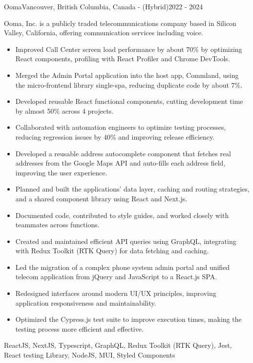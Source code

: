 \begin{projects}
    \project
    {Ooma}{Vancouver, British Columbia, Canada - (Hybrid)}{2022 - 2024}
    {}
    {Ooma, Inc. is a publicly traded telecommunications company based in Silicon Valley, California, offering communication services including voice.
    \begin{itemize}
        \item Improved Call Center screen load performance by about 70\% by optimizing React components, profiling with React Profiler and Chrome DevTools.
        \item Merged the Admin Portal application into the host app, Commland, using the micro-frontend library single-spa, reducing duplicate code by about 7\%.
        \item Developed reusable React functional components, cutting development time by almost 50\% across 4 projects.
        \item Collaborated with automation engineers to optimize testing processes, reducing regression issues by 40\% and improving release efficiency.
        \item Developed a reusable address autocomplete component that fetches real addresses from the Google Maps API and auto-fills each address field, improving the user experience.
        \item Planned and built the applications' data layer, caching and routing strategies, and a shared component library using React and Next.js.
        \item Documented code, contributed to style guides, and worked closely with teammates across functions.
        \item Created and maintained efficient API queries using GraphQL, integrating with Redux Toolkit (RTK Query) for data fetching and caching.
        \item Led the migration of a complex phone system admin portal and unified telecom application from jQuery and JavaScript to a React.js SPA.
        \item Redesigned interfaces around modern UI/UX principles, improving application responsiveness and maintainability.
        \item Optimized the Cypress.js test suite to improve execution times, making the testing process more efficient and effective.
    \end{itemize}}
    {ReactJS, NextJS, Typescript, GraphQL, Redux Toolkit (RTK Query), Jest, React testing Library, NodeJS, MUI, Styled Components}


\end{projects}
